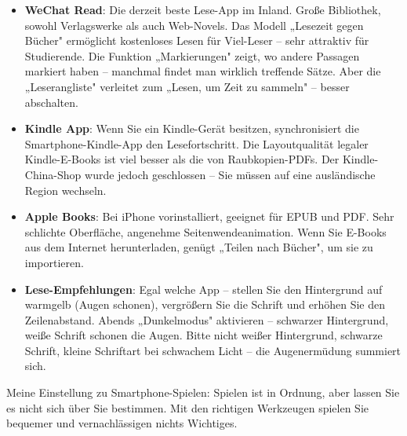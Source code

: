 \begin{itemize}
  \item \textbf{WeChat Read}: Die derzeit beste Lese-App im Inland. Große Bibliothek, sowohl Verlagswerke als auch Web-Novels. Das Modell „Lesezeit gegen Bücher" ermöglicht kostenloses Lesen für Viel-Leser – sehr attraktiv für Studierende. Die Funktion „Markierungen" zeigt, wo andere Passagen markiert haben – manchmal findet man wirklich treffende Sätze. Aber die „Leserangliste" verleitet zum „Lesen, um Zeit zu sammeln" – besser abschalten.
  \item \textbf{Kindle App}: Wenn Sie ein Kindle-Gerät besitzen, synchronisiert die Smartphone-Kindle-App den Lesefortschritt. Die Layoutqualität legaler Kindle-E-Books ist viel besser als die von Raubkopien-PDFs. Der Kindle-China-Shop wurde jedoch geschlossen – Sie müssen auf eine ausländische Region wechseln.
  \item \textbf{Apple Books}: Bei iPhone vorinstalliert, geeignet für EPUB und PDF. Sehr schlichte Oberfläche, angenehme Seitenwendeanimation. Wenn Sie E-Books aus dem Internet herunterladen, genügt „Teilen nach Bücher", um sie zu importieren.
  \item \textbf{Lese-Empfehlungen}: Egal welche App – stellen Sie den Hintergrund auf warmgelb (Augen schonen), vergrößern Sie die Schrift und erhöhen Sie den Zeilenabstand. Abends „Dunkelmodus" aktivieren – schwarzer Hintergrund, weiße Schrift schonen die Augen. Bitte nicht weißer Hintergrund, schwarze Schrift, kleine Schriftart bei schwachem Licht – die Augenermüdung summiert sich.
\end{itemize}


Meine Einstellung zu Smartphone-Spielen: Spielen ist in Ordnung, aber lassen Sie es nicht sich über Sie bestimmen. Mit den richtigen Werkzeugen spielen Sie bequemer und vernachlässigen nichts Wichtiges.

